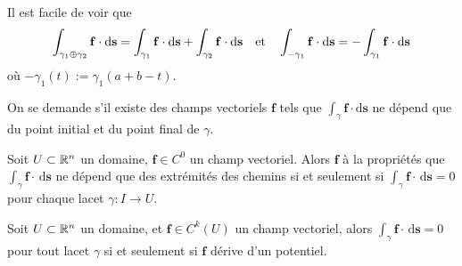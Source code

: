 \begin{remarque}
	Il est facile de voir que
	\[
	\int_{\gamma_1 \oplus \gamma_2} \mathbf{f} \cdot \mathrm d \mathbf{s} = \int_{\gamma_1} \mathbf{f} \cdot \mathrm d \mathbf{s} + \int_{\gamma_2} \mathbf{f} \cdot \mathrm d \mathbf{s} \quad \text{et} \quad \int_{-\gamma_1} \mathbf{f} \cdot \mathrm d \mathbf{s} = - \int_{\gamma_1} \mathbf{f} \cdot \mathrm d \mathbf{s} 
	\]
	où $-\gamma_1(t) := \gamma_1(a+b -t)$.
\end{remarque}

On se demande s'il existe des champs vectoriels $\bm f$ tels que $\int_\gamma \bm f \cdot \mathrm d \bm s$ ne dépend que du point initial et du point final de $\gamma$.

\begin{lemme}
	Soit $U \subset \mathbb{R}^n$ un domaine, $\bm f \in C^0$ un champ vectoriel. Alors $\bm f$ à la propriétés que $\int_\gamma \bm f \cdot \, \mathrm d \bm s$ ne dépend que des extrémités des chemins si et seulement si $\int_\gamma \bm f \cdot \, \mathrm d \bm s  = 0$ pour chaque lacet $\gamma : I \to U$.
\end{lemme}



\begin{theoreme} \label{thm: caractérisation de dérive}
	Soit $U \subset \mathbb{R}^n$ un domaine, et $\bm f \in C^k(U)$ un champ vectoriel, alors $\int_\gamma \bm f\cdot \, \mathrm d \bm s = 0$ pour tout lacet $\gamma$ si et seulement si $\bm f$ dérive d'un potentiel.
\end{theoreme}

